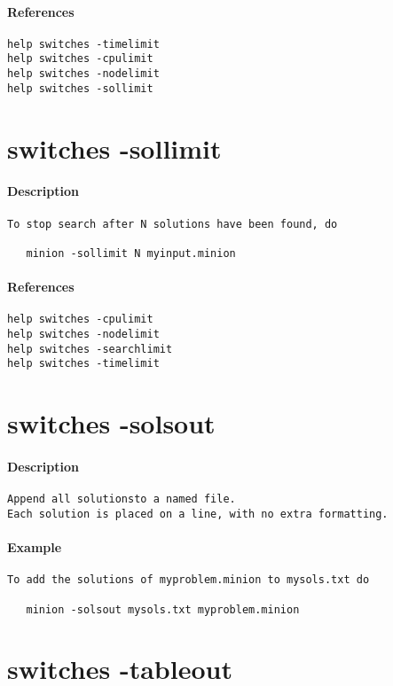\paragraph{References}
{\footnotesize
\begin{verbatim}
help switches -timelimit
help switches -cpulimit
help switches -nodelimit
help switches -sollimit
\end{verbatim}
}
\section{switches -sollimit}
\paragraph{Description}
{\footnotesize
\begin{verbatim}
To stop search after N solutions have been found, do

   minion -sollimit N myinput.minion
\end{verbatim}
}
\paragraph{References}
{\footnotesize
\begin{verbatim}
help switches -cpulimit
help switches -nodelimit
help switches -searchlimit
help switches -timelimit
\end{verbatim}
}
\section{switches -solsout}
\paragraph{Description}
{\footnotesize
\begin{verbatim}
Append all solutionsto a named file.
Each solution is placed on a line, with no extra formatting.
\end{verbatim}
}
\paragraph{Example}
{\footnotesize
\begin{verbatim}
To add the solutions of myproblem.minion to mysols.txt do

   minion -solsout mysols.txt myproblem.minion
\end{verbatim}
}
\section{switches -tableout}
